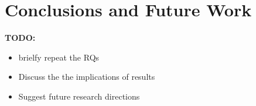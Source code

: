\section{Conclusions and Future Work} %
\textbf{TODO:}
\begin{itemize}
    \item brielfy repeat the RQs
    \item Discuss the the implications of results
    \item Suggest future research directions
\end{itemize}
